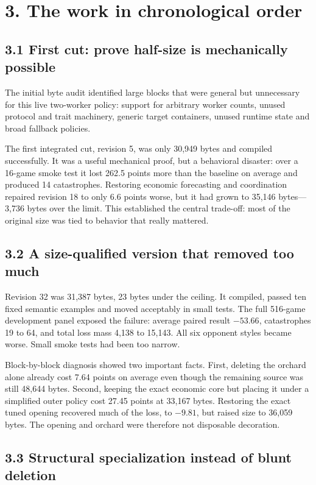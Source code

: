 \documentclass[10pt,a4paper]{article}
\begin{document}
\section*{3. The work in chronological order}

\subsection*{3.1 First cut: prove half-size is mechanically possible}

The initial byte audit identified large blocks that were general but unnecessary for this live
two-worker policy: support for arbitrary worker counts, unused protocol and trait machinery,
generic target containers, unused runtime state and broad fallback policies.

The first integrated cut, revision 5, was only 30,949 bytes and compiled successfully. It was a
useful mechanical proof, but a behavioral disaster: over a 16-game smoke test it lost 262.5
points more than the baseline on average and produced 14 catastrophes. Restoring economic
forecasting and coordination repaired revision 18 to only 6.6 points worse, but it had grown to
35,146 bytes---3,736 bytes over the limit. This established the central trade-off: most of the
original size was tied to behavior that really mattered.

\subsection*{3.2 A size-qualified version that removed too much}

Revision 32 was 31,387 bytes, 23 bytes under the ceiling. It compiled, passed ten fixed semantic
examples and moved acceptably in small tests. The full 516-game development panel exposed the
failure: average paired result $-53.66$, catastrophes 19 to 64, and total loss mass 4,138 to
15,143. All six opponent styles became worse. Small smoke tests had been too narrow.

Block-by-block diagnosis showed two important facts. First, deleting the orchard alone already
cost 7.64 points on average even though the remaining source was still 48,644 bytes. Second,
keeping the exact economic core but placing it under a simplified outer policy cost 27.45 points
at 33,167 bytes. Restoring the exact tuned opening recovered much of the loss, to $-9.81$, but
raised size to 36,059 bytes. The opening and orchard were therefore not disposable decoration.

\subsection*{3.3 Structural specialization instead of blunt deletion}
\end{document}
